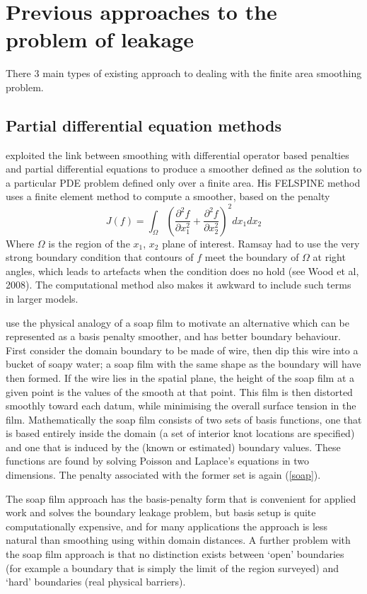 \documentclass[smallextended]{svjour3}       %
\newcommand{\beq}{\begin{equation}}
\newcommand{\eeq}{\end{equation}}
\newcommand{\pdif}[2]{\frac{\partial #1}{\partial #2}}
\begin{document}
\section{Previous approaches to the problem of leakage}
\label{previous-approaches}

There 3 main types of existing approach to dealing with the finite area smoothing problem.

\subsection*{Partial differential equation methods}

\cite{Ramsay:2002uo} exploited the link between smoothing with differential operator based penalties and partial differential equations to produce a smoother defined as the solution to a particular PDE problem defined only over a finite area. His FELSPINE method uses a finite element method to compute a smoother, based on the penalty 
\beq
J(f) = \int_\Omega \left ( \pdif{^2 f}{x_1^2} + \pdif{^2 f}{x_2^2} \right )^2 dx_1 dx_2 
\label{soap}
\eeq 
Where $\Omega$ is the region of the $x_1$, $x_2$ plane of interest. Ramsay had to use the very strong boundary condition that contours of $f$ meet the boundary of $\Omega$ at right angles, which leads to artefacts when the condition does no hold (see Wood et al, 2008). The computational method also makes it awkward to include such terms in larger models.

\cite{Wood:2008vo} use the physical analogy of a soap film to motivate an alternative which can be represented as a basis penalty smoother, and has better boundary behaviour. First consider the domain boundary to be made of wire, then dip this wire into a bucket of soapy water; a soap film with the same shape as the boundary will have then formed. If the wire lies in the spatial plane, the height of the soap film at a given point is the values of the smooth at that point. This film is then distorted smoothly toward each datum, while minimising the overall surface tension in the film. Mathematically the soap film consists of two sets of basis functions, one that is based entirely inside the domain (a set of interior knot locations are specified) and one that is induced by the (known or estimated) boundary values. These functions are found by solving Poisson and Laplace's equations in two dimensions. The penalty associated with the former set is again (\ref{soap}). 

The soap film approach has the basis-penalty form that is convenient for applied work and solves the boundary leakage problem, but basis setup is quite computationally expensive, and for many applications the approach is less natural than smoothing using within domain distances. A further problem with the soap film approach is that no distinction exists between `open' boundaries (for example a boundary that is simply the limit of the region surveyed) and `hard' boundaries (real physical barriers).
\end{document}
